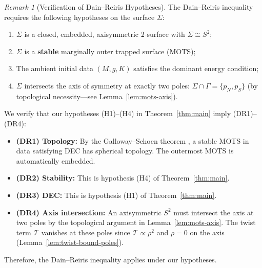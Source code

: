 \documentclass[12pt]{article}
\theoremstyle{plain}
\theoremstyle{definition}
\theoremstyle{remark}
\newtheorem{remark}[theorem]{Remark}
\begin{document}
\begin{remark}[Verification of Dain--Reiris Hypotheses]\label{rem:dain-reiris-hypotheses}
The Dain--Reiris inequality \cite{dain2011} requires the following hypotheses on the surface $\Sigma$:
\begin{enumerate}
    \item[(DR1)] $\Sigma$ is a closed, embedded, axisymmetric 2-surface with $\Sigma \cong S^2$;
    \item[(DR2)] $\Sigma$ is a \textbf{stable} marginally outer trapped surface (MOTS);
    \item[(DR3)] The ambient initial data $(M, g, K)$ satisfies the dominant energy condition;
    \item[(DR4)] $\Sigma$ intersects the axis of symmetry at exactly two poles: $\Sigma \cap \Gamma = \{p_N, p_S\}$ (by topological necessity---see Lemma~\ref{lem:mots-axis}).
\end{enumerate}

We verify that our hypotheses (H1)--(H4) in Theorem~\ref{thm:main} imply (DR1)--(DR4):
\begin{itemize}
    \item \textbf{(DR1) Topology:} By the Galloway--Schoen theorem \cite{gallowayschoen2006}, a stable MOTS in data satisfying DEC has spherical topology. The outermost MOTS is automatically embedded.
    \item \textbf{(DR2) Stability:} This is hypothesis (H4) of Theorem~\ref{thm:main}.
    \item \textbf{(DR3) DEC:} This is hypothesis (H1) of Theorem~\ref{thm:main}.
    \item \textbf{(DR4) Axis intersection:} An axisymmetric $S^2$ must intersect the axis at two poles by the topological argument in Lemma~\ref{lem:mots-axis}. The twist term $\mathcal{T}$ vanishes at these poles since $\mathcal{T} \propto \rho^2$ and $\rho = 0$ on the axis (Lemma~\ref{lem:twist-bound-poles}).
\end{itemize}
Therefore, the Dain--Reiris inequality applies under our hypotheses.
\end{remark}
\end{document}
